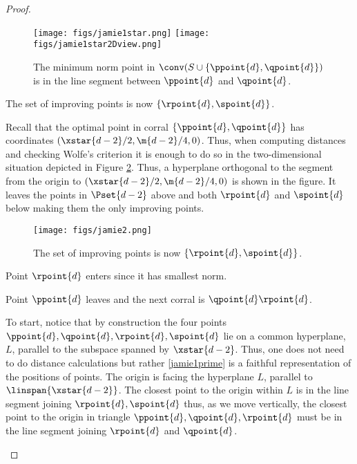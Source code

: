 \begin{proof}
\begin{figure}
\texttt{[image: figs/jamie1star.png]}
\texttt{[image: figs/jamie1star2Dview.png]}
\caption{The minimum norm point in $\conv(S \cup \{\ppoint{d}, \qpoint{d}\})$ is in the line segment between $\ppoint{d}$ and $\qpoint{d}$.}\label{jamie1star}
\end{figure}

\begin{claim}
The set of improving points is now $\{\rpoint{d}, \spoint{d}\}$. 
\end{claim}
\begin{claimproof}
Recall that the optimal point in corral $\{ \ppoint{d},\qpoint{d} \}$ has coordinates $(\xstar{d-2}/2, \m{d-2}/4,0)$. 
Thus, when computing distances and checking Wolfe's criterion it is enough to do so in the two-dimensional situation 
depicted in Figure \ref{jamie2}. Thus,
a hyperplane orthogonal to the segment from the origin to $(\xstar{d-2}/2, \m{d-2}/4,0)$ is shown in the figure. It leaves the points in $\Pset{d-2}$ above and both $\rpoint{d}$ and $\spoint{d}$ below making them the only improving points.
\end{claimproof}

\begin{figure}
\begin{center}
\texttt{[image: figs/jamie2.png]}
\end{center}
\caption{The set of improving points is now $\{\rpoint{d},\spoint{d}\}$.}\label{jamie2}
\end{figure}

Point $\rpoint{d}$ enters since it has smallest norm.
\begin{claim}
Point $\ppoint{d}$ leaves and the next corral is $\qpoint{d} \rpoint{d}$. 
\end{claim}
\begin{claimproof}
To start, notice that by construction the four points $\ppoint{d},\qpoint{d},\rpoint{d},\spoint{d}$ lie on a common hyperplane, $L$, parallel to the subspace spanned by
$\xstar{d-2}$. Thus, one does not need to do distance calculations but rather  \cref{jamie1prime} is a faithful representation of the positions of points. The origin is facing the hyperplane $L$, parallel to $\linspan{\xstar{d-2}}$.  The closest point to the origin 
within $L$ is in the line segment joining $\rpoint{d},\spoint{d}$ thus, as we move vertically, the closest point to the origin in triangle $\ppoint{d},\qpoint{d},\rpoint{d}$ must be in the line segment joining 
$\rpoint{d}$ and $\qpoint{d}$.
\end{claimproof}



\end{proof}
